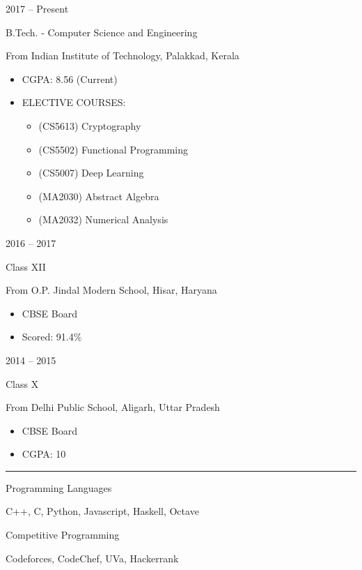 \documentclass[a4paper,10pt]{article}
\newlength{\cvcolumngapwidth}
\newlength{\cvleftcolumnwidth}
\newlength{\cvrightcolumnwidth}
\newcommand{\cvsectionstyle}[1]{{\normalsize\cvsectionfont\textcolor{cvsectioncolor}{#1}}}
\newcommand{\cvtitlestyle}[1]{{\large\cvtitlefont\textcolor{cvtitlecolor}{#1}}}
\newcommand{\cvdurationstyle}[1]{{\small\cvdurationfont\textcolor{cvdurationcolor}{#1}}}
\newcommand{\cvheadingstyle}[1]{{\normalsize\cvheadingfont\textcolor{cvheadingcolor}{#1}}}
\newlength{\cvafteritemskipamount}
\newlength{\cvaftersectionskipamount}
\newlength{\cvbetweensectionandheadingextraskipamount}
\newlength{\cvaftertitleskipamount}
\newlength{\cvparskip}
\newcommand{\cvsection}[1]{
    \begin{minipage}[t]{\cvleftcolumnwidth}
        \raggedleft\cvsectionstyle{#1}
    \end{minipage}%
    \hspace{\cvcolumngapwidth}%
    \begin{minipage}[t]{\cvrightcolumnwidth}
        \textcolor{cvrulecolor}{\rule{\cvrightcolumnwidth}{0.3mm}}
    \end{minipage}

    \vspace{\cvaftersectionskipamount}
}
\newcommand{\cvitem}[2]{
    \begin{minipage}[t]{\cvleftcolumnwidth}
        \raggedleft #1
    \end{minipage}%
    \hspace{\cvcolumngapwidth}%
    \begin{minipage}[t]{\cvrightcolumnwidth}
        \setlength{\parskip}{\cvparskip} #2
    \end{minipage}

    \vspace{\cvafteritemskipamount}
}
\newcommand{\cvtitle}[1]{
    \cvtitlestyle{#1}

    \vspace{\cvaftertitleskipamount}
    \vspace{-\cvparskip}
}
\begin{document}
\cvitem{
    \cvdurationstyle{2017 -- Present}
}{
    \cvtitle{B.Tech. - Computer Science and Engineering}

    From Indian Institute of Technology, Palakkad, Kerala

    \begin{itemize}[leftmargin=*]
        \item CGPA: 8.56 (Current)
        \item ELECTIVE COURSES: 
        \begin{itemize}[leftmargin=*]
        \item (CS5613) Cryptography
        \item (CS5502) Functional Programming
        \item (CS5007) Deep Learning
        \item (MA2030) Abstract Algebra
        \item (MA2032) Numerical Analysis
        \end{itemize}
    \end{itemize}
}

\cvitem{
    \cvdurationstyle{2016 -- 2017}
}{
    \cvtitle{Class XII}

    From O.P. Jindal Modern School, Hisar, Haryana

    \begin{itemize}[leftmargin=*]
        \item CBSE Board
        \item Scored: 91.4\%
    \end{itemize}
}

\cvitem{
    \cvdurationstyle{2014 -- 2015}
}{
    \cvtitle{Class X}

    From Delhi Public School, Aligarh, Uttar Pradesh

    \begin{itemize}[leftmargin=*]
        \item CBSE Board
        \item CGPA: 10
    \end{itemize}
}



\cvsection{TECHNICAL SKILLS}

\vspace{\cvbetweensectionandheadingextraskipamount}

\cvitem{
    \cvheadingstyle{Programming Languages}
}{
    
    C++, C, Python, Javascript, Haskell, Octave

}
\cvitem{
    \cvheadingstyle{Competitive Programming}
}{
    
    
   Codeforces, CodeChef, UVa, Hackerrank
    
}
\end{document}

